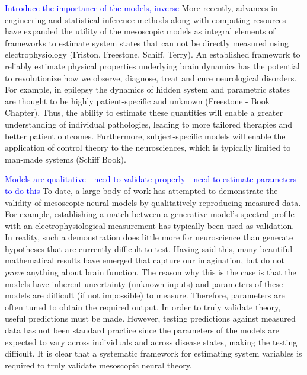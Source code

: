 \documentclass{article}
\newcommand{\brian}[1]{\textcolor{blue}{#1}}
\begin{document}
\brian{Introduce the importance of the models, inverse}
More recently, advances in engineering and statistical inference methods along with computing resources have expanded the utility of the mesoscopic models as integral elements of frameworks to estimate system states that can not be directly measured using electrophysiology (Friston, Freestone, Schiff, Terry). An established framework to reliably estimate physical properties underlying brain dynamics has the potential to revolutionize how we observe, diagnose, treat and cure neurological disorders. For example, in epilepsy the dynamics of hidden system and parametric states are thought to be highly patient-specific and unknown (Freestone - Book Chapter). Thus, the ability to estimate these quantities will enable a greater understanding of individual pathologies, leading to more tailored therapies and better patient outcomes.  Furthermore, subject-specific models will enable the application of control theory to the neurosciences, which is typically limited to man-made systems (Schiff Book).

\brian{Models are qualitative - need to validate properly - need to estimate parameters to do this}
To date, a large body of work has attempted to demonstrate the validity of mesoscopic neural models by qualitatively reproducing measured data. For example, establishing a match between a generative model's spectral profile with an electrophysiological measurement has typically been used as validation. In reality, such a demonstration does little more for neuroscience than generate hypotheses that are currently difficult to test. Having said this, many beautiful mathematical results have emerged that capture our imagination, but do not \emph{prove} anything about brain function. The reason why this is the case is that the models have inherent uncertainty (unknown inputs) and parameters of these models are difficult (if not impossible) to measure. Therefore, parameters are often tuned to obtain the required output. In order to truly validate theory, useful predictions must be made. However, testing predictions against measured data has not been standard practice since the parameters of the models are expected to vary across individuals and across disease states, making the testing difficult. It is clear that a systematic framework for estimating system variables is required to truly validate mesoscopic neural theory.
\end{document}
